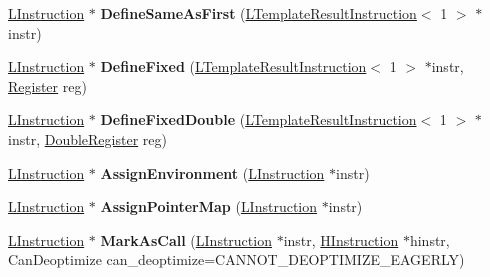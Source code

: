 \begin{DoxyCompactItemize}
\item 
\hyperlink{classv8_1_1internal_1_1_l_instruction}{L\+Instruction} $\ast$ {\bfseries Define\+Same\+As\+First} (\hyperlink{classv8_1_1internal_1_1_l_template_result_instruction}{L\+Template\+Result\+Instruction}$<$ 1 $>$ $\ast$instr)\hypertarget{classv8_1_1internal_1_1_l_chunk_builder_ab50375a6b23b598f7ece2e874e06df3f}{}\label{classv8_1_1internal_1_1_l_chunk_builder_ab50375a6b23b598f7ece2e874e06df3f}

\item 
\hyperlink{classv8_1_1internal_1_1_l_instruction}{L\+Instruction} $\ast$ {\bfseries Define\+Fixed} (\hyperlink{classv8_1_1internal_1_1_l_template_result_instruction}{L\+Template\+Result\+Instruction}$<$ 1 $>$ $\ast$instr, \hyperlink{structv8_1_1internal_1_1_register}{Register} reg)\hypertarget{classv8_1_1internal_1_1_l_chunk_builder_abcf1eee95878690cc41fe4a461cc9a0b}{}\label{classv8_1_1internal_1_1_l_chunk_builder_abcf1eee95878690cc41fe4a461cc9a0b}

\item 
\hyperlink{classv8_1_1internal_1_1_l_instruction}{L\+Instruction} $\ast$ {\bfseries Define\+Fixed\+Double} (\hyperlink{classv8_1_1internal_1_1_l_template_result_instruction}{L\+Template\+Result\+Instruction}$<$ 1 $>$ $\ast$instr, \hyperlink{structv8_1_1internal_1_1_double_register}{Double\+Register} reg)\hypertarget{classv8_1_1internal_1_1_l_chunk_builder_a3d1252fda53d6ad93f994432878bf8b9}{}\label{classv8_1_1internal_1_1_l_chunk_builder_a3d1252fda53d6ad93f994432878bf8b9}

\item 
\hyperlink{classv8_1_1internal_1_1_l_instruction}{L\+Instruction} $\ast$ {\bfseries Assign\+Environment} (\hyperlink{classv8_1_1internal_1_1_l_instruction}{L\+Instruction} $\ast$instr)\hypertarget{classv8_1_1internal_1_1_l_chunk_builder_a987e027a28fb5e7808d7deff695d1fc5}{}\label{classv8_1_1internal_1_1_l_chunk_builder_a987e027a28fb5e7808d7deff695d1fc5}

\item 
\hyperlink{classv8_1_1internal_1_1_l_instruction}{L\+Instruction} $\ast$ {\bfseries Assign\+Pointer\+Map} (\hyperlink{classv8_1_1internal_1_1_l_instruction}{L\+Instruction} $\ast$instr)\hypertarget{classv8_1_1internal_1_1_l_chunk_builder_a918b5dad2d948ceecb7fa7175f7d4e50}{}\label{classv8_1_1internal_1_1_l_chunk_builder_a918b5dad2d948ceecb7fa7175f7d4e50}

\item 
\hyperlink{classv8_1_1internal_1_1_l_instruction}{L\+Instruction} $\ast$ {\bfseries Mark\+As\+Call} (\hyperlink{classv8_1_1internal_1_1_l_instruction}{L\+Instruction} $\ast$instr, \hyperlink{classv8_1_1internal_1_1_h_instruction}{H\+Instruction} $\ast$hinstr, Can\+Deoptimize can\+\_\+deoptimize=C\+A\+N\+N\+O\+T\+\_\+\+D\+E\+O\+P\+T\+I\+M\+I\+Z\+E\+\_\+\+E\+A\+G\+E\+R\+LY)\hypertarget{classv8_1_1internal_1_1_l_chunk_builder_a1fd6ee920d764c6e4df4257feea8acc7}{}\label{classv8_1_1internal_1_1_l_chunk_builder_a1fd6ee920d764c6e4df4257feea8acc7}


\end{DoxyCompactItemize}
